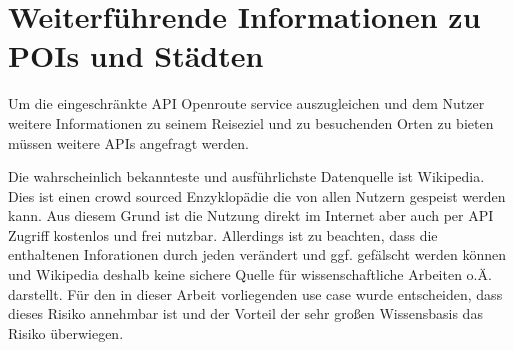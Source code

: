 \section{Weiterführende Informationen zu POIs und Städten}
Um die eingeschränkte API Openroute service auszugleichen und dem Nutzer weitere Informationen zu seinem Reiseziel und zu besuchenden Orten zu bieten müssen weitere APIs angefragt werden.

\vspace{0.25cm}

Die wahrscheinlich bekannteste und ausführlichste Datenquelle ist Wikipedia. Dies ist einen crowd sourced Enzyklopädie die von allen Nutzern gespeist werden kann. Aus diesem Grund ist die Nutzung direkt im Internet aber auch per API Zugriff kostenlos und frei nutzbar. Allerdings ist zu beachten, dass die enthaltenen Inforationen durch jeden verändert und ggf. gefälscht werden können und Wikipedia deshalb keine sichere Quelle für wissenschaftliche Arbeiten o.Ä. darstellt. Für den in dieser Arbeit vorliegenden use case wurde entscheiden, dass dieses Risiko annehmbar ist und der Vorteil der sehr großen Wissensbasis das Risiko überwiegen. 
